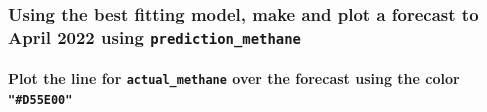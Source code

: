 \documentclass[
]{article}
\begin{document}
\hypertarget{using-the-best-fitting-model-make-and-plot-a-forecast-to-april-2022-using-prediction_methane}{%
\subsubsection{\texorpdfstring{Using the best fitting model, make and
plot a forecast to April 2022 using
\texttt{prediction\_methane}}{Using the best fitting model, make and plot a forecast to April 2022 using prediction\_methane}}\label{using-the-best-fitting-model-make-and-plot-a-forecast-to-april-2022-using-prediction_methane}}

\hypertarget{plot-the-line-for-actual_methane-the-forecast-using-the-color-d55e00}{%
\paragraph{\texorpdfstring{Plot the line for \texttt{actual\_methane}
\textbf{over} the forecast using the color
\texttt{"\#D55E00"}}{Plot the line for actual\_methane  the forecast using the color "\#D55E00"}}\label{plot-the-line-for-actual_methane-the-forecast-using-the-color-d55e00}}
\end{document}

